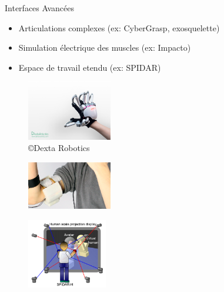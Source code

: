 \documentclass[compress, noflama]{beamer}
\begin{document}
\begin{frame}{Interfaces Avancées}
\begin{itemize}
\item Articulations complexes (ex: CyberGrasp, exosquelette)
\item Simulation électrique des muscles (ex: Impacto)
\item Espace de travail etendu (ex: SPIDAR)
\end{itemize}
\begin{multicols}{3}
\begin{figure}
\centering
\includegraphics[width=3.7cm]{images/dexmo-prototype-81}
\vspace{0.3cm}
\caption{\copyright Dexta Robotics}
\end{figure}
\begin{figure}
\centering
\includegraphics[width=3.7cm]{images/impacto}
\vspace{0.85cm}
\caption{\cite{lopes2015}}
\end{figure}
\begin{figure}
\centering
\includegraphics[width=3.5cm]{images/spidar}
\caption{\cite{Hasegawa2006a}}
\end{figure}
\end{multicols}
\end{frame}
\end{document}
